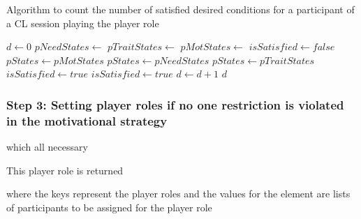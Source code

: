 \begin{algoritmo}
\caption{Algorithm to count the number of satisfied desired conditions for a participant  of a CL session  playing the player role }
\label{algorithm:no-satisfied-desired-conditions}
\begin{algorithmic}[1]\small
{}
  \State $d \gets 0$
  \State $pNeedStates \gets$ 
  \State $pTraitStates \gets$ 
  \State $pMotStates \gets$ 
    \State $isSatisfied \gets false$
       $pStates \gets pMotStates$
      \EndIf
       $pStates \gets pNeedStates$
      \EndIf
       $pStates \gets pTraitStates$
      \EndIf
       $isSatisfied \gets true$
      \Else
           $isSatisfied \gets true$
          \EndIf
        \EndFor
      \EndIf
    \EndFor
     $d \gets d+1$
    \EndIf
  \EndFor
  \State \Return $d$
\EndFunction
\end{algorithmic}
\end{algoritmo}

\subsubsection*{Step 3: Setting player roles if no one restriction is violated in the motivational strategy}



 which all necessary 

This player role is returned  


 where the keys represent the player roles and the values for the element  are lists of participants to be assigned for the player role 

